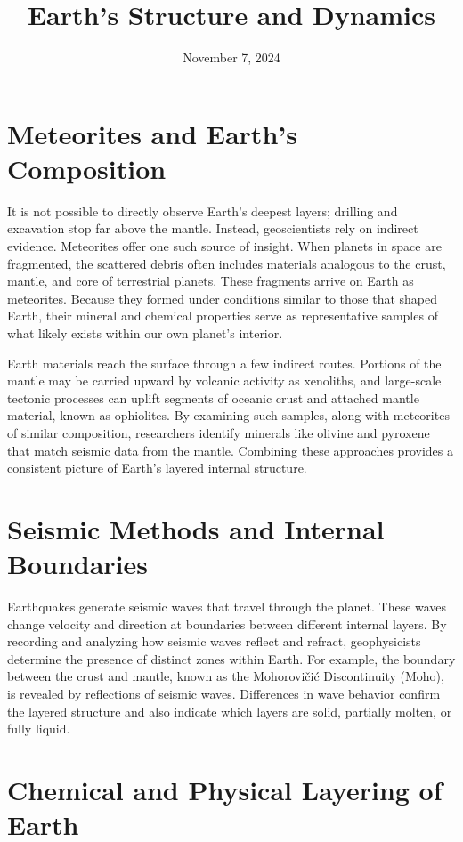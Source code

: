 \documentclass{article}
\title{Earth's Structure and Dynamics}
\date{November 7, 2024}
\begin{document}
\maketitle

\section*{Meteorites and Earth's Composition}

It is not possible to directly observe Earth's deepest layers; drilling and excavation stop far above the mantle. Instead, geoscientists rely on indirect evidence. Meteorites offer one such source of insight. When planets in space are fragmented, the scattered debris often includes materials analogous to the crust, mantle, and core of terrestrial planets. These fragments arrive on Earth as meteorites. Because they formed under conditions similar to those that shaped Earth, their mineral and chemical properties serve as representative samples of what likely exists within our own planet's interior.

Earth materials reach the surface through a few indirect routes. Portions of the mantle may be carried upward by volcanic activity as xenoliths, and large-scale tectonic processes can uplift segments of oceanic crust and attached mantle material, known as ophiolites. By examining such samples, along with meteorites of similar composition, researchers identify minerals like olivine and pyroxene that match seismic data from the mantle. Combining these approaches provides a consistent picture of Earth's layered internal structure.

\section*{Seismic Methods and Internal Boundaries}

Earthquakes generate seismic waves that travel through the planet. These waves change velocity and direction at boundaries between different internal layers. By recording and analyzing how seismic waves reflect and refract, geophysicists determine the presence of distinct zones within Earth. For example, the boundary between the crust and mantle, known as the Mohorovičić Discontinuity (Moho), is revealed by reflections of seismic waves. Differences in wave behavior confirm the layered structure and also indicate which layers are solid, partially molten, or fully liquid.

\section*{Chemical and Physical Layering of Earth}
\end{document}
